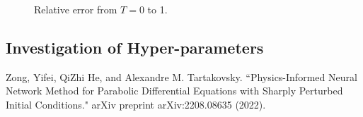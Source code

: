 \documentclass[11pt, a4paper]{article}
\begin{document}
    \begin{figure}[ht!]
        \caption{Relative error from $T=0$ to 1.}
        \label{fig:relerrorwitht}
    \end{figure}

    \subsection{Investigation of Hyper-parameters}

    
    \begin{thebibliography}{9}
           Zong, Yifei, QiZhi He, and Alexandre M. Tartakovsky. ``Physics-Informed Neural Network Method for Parabolic Differential Equations with Sharply Perturbed Initial Conditions." arXiv preprint arXiv:2208.08635 (2022).
    \end{thebibliography}
\end{document}

